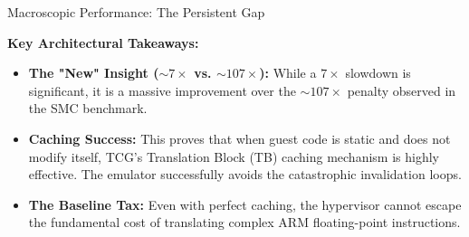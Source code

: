 \documentclass[aspectratio=169]{beamer} %
\begin{document}
  \begin{frame}{Macroscopic Performance: The Persistent Gap}
    \vspace{0.2cm}
    
    \begin{table}[]
        \centering
        \renewcommand{\arraystretch}{1.3}
    \end{table}

    \vspace{0.3cm}
    \textbf{Key Architectural Takeaways:}
    \begin{itemize}
        \item \textbf{The "New" Insight ($\sim 7\times$ vs. $\sim 107\times$):} While a $7\times$ slowdown is significant, it is a massive improvement over the $\sim 107\times$ penalty observed in the SMC benchmark.
        \item \textbf{Caching Success:} This proves that when guest code is static and does not modify itself, TCG's Translation Block (TB) caching mechanism is highly effective. The emulator successfully avoids the catastrophic invalidation loops.
        \item \textbf{The Baseline Tax:} Even with perfect caching, the hypervisor cannot escape the fundamental cost of translating complex ARM floating-point instructions.
    \end{itemize}
  \end{frame}
\end{document}
